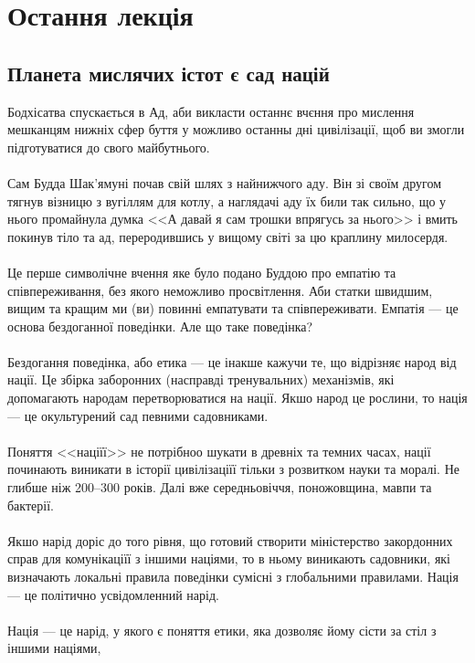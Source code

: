 \section{Остання лекція}

\subsection{Планета мислячих істот є сад націй}

Бодхісатва спускається в Ад, аби викласти останнє вчєння про мислення
мешканцям нижніх сфер буття у можливо останны дні цивілізації, щоб ви
змогли підготуватися до свого майбутнього.
\\
\\
Сам Будда Шак'ямуні почав свій шлях з найнижчого аду. Він зі своїм другом
тягнув візницю з вугіллям для котлу, а наглядачі аду їх били так сильно,
що у нього промайнула думка <<А давай я сам трошки впрягусь за нього>> і вмить
покинув тіло та ад, переродившись у вищому світі за цю краплину милосердя.
\\
\\
Це перше символічне вчення яке було подано Буддою про емпатію та співпереживання,
без якого неможливо просвітлення. Аби статки швидшим, вищим та кращим ми (ви)
повинні емпатувати та співпереживати. Емпатія --- це основа бездоганної поведінки.
Але що таке поведінка?
\\
\\
Бездогання поведінка, або етика --- це інакше кажучи те, що відрізняє народ від нації.
Це збірка заборонних (насправді тренувальних) механізмів, які допомагають народам перетворюватися на нації.
Якшо народ це рослини, то нація --- це окультурений сад певними садовниками.
\\
\\
Поняття <<націїї>> не потрібноо шукати в древніх та темних часах, нації починають виникати
в історії цивілізаціїї тільки з розвитком науки та моралі. Не глибше ніж 200--300 років. Далі
вже середньовіччя, поножовщина, мавпи та бактерії.
\\
\\
Якшо нарід доріс до того рівня, що готовий створити міністерство закордонних справ для комунікаціїї
з іншими націями, то в ньому виникають садовники, які визначають локальні правила поведінки
сумісні з глобальними правилами. Нація --- це політично усвідомленний нарід.
\\
\\
Нація --- це нарід, у якого є поняття етики, яка дозволяє йому сісти за стіл з іншими націями,
